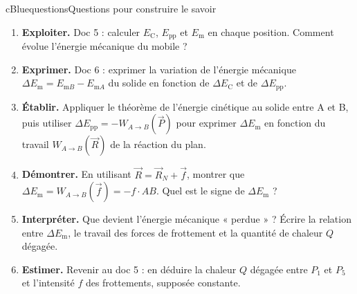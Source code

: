 \documentclass[11pt,a4paper]{article}
\newcommand{\vect}[1]{\overrightarrow{#1}}
\newcommand{\Ec}{E_{\mathrm{C}}}
\newcommand{\kw}[1]{{\sffamily\bfseries\color{cBlue}#1}}   %
\newcommand{\Epp}{E_{\mathrm{pp}}}
\newcommand{\Em}{E_{\mathrm{m}}}
\newcommand{\Emi}[1]{E_{\mathrm{m}#1}}
\newcommand{\WAB}[1]{W_{A\to B}(\vect{#1})}
\begin{document}
\begin{rub}{cBlue}{questions}{Questions pour construire le savoir}
\begin{enumerate}
  \item \kw{Exploiter.} Doc 5 : calculer $\Ec$, $\Epp$ et $\Em$ en chaque position. Comment évolue l’énergie mécanique du mobile ?
  \item \kw{Exprimer.} Doc 6 : exprimer la variation de l’énergie mécanique $\Delta\Em = \Emi{B} - \Emi{A}$ du solide en fonction de $\Delta\Ec$ et de $\Delta\Epp$.
  \item \kw{Établir.} Appliquer le théorème de l’énergie cinétique au solide entre A et B, puis utiliser $\Delta\Epp = -\WAB P$ pour exprimer $\Delta\Em$ en fonction du travail $\WAB R$ de la réaction du plan.
  \item \kw{Démontrer.} En utilisant $\vect R = \vect R_N + \vect f$, montrer que $\Delta\Em = \WAB f = -f\cdot AB$. Quel est le signe de $\Delta\Em$ ?
  \item \kw{Interpréter.} Que devient l’énergie mécanique « perdue » ? Écrire la relation entre $\Delta\Em$, le travail des forces de frottement et la quantité de chaleur $Q$ dégagée.
  \item \kw{Estimer.} Revenir au doc 5 : en déduire la chaleur $Q$ dégagée entre $P_1$ et $P_5$ et l’intensité $f$ des frottements, supposée constante.
\end{enumerate}
\end{rub}
\end{document}
